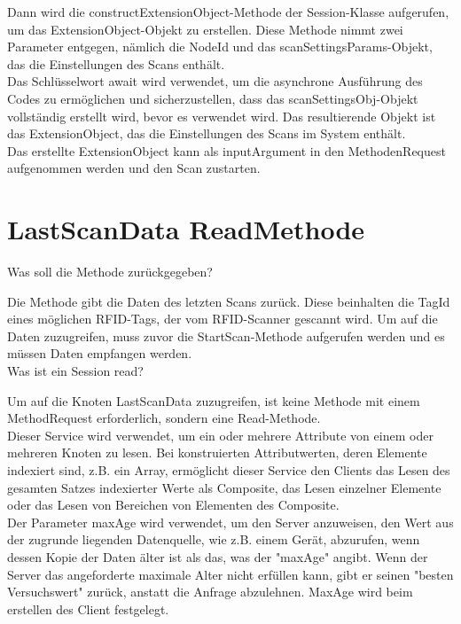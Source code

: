 Dann wird die constructExtensionObject-Methode der Session-Klasse aufgerufen, um das ExtensionObject-Objekt zu erstellen. Diese Methode nimmt zwei Parameter entgegen, nämlich die NodeId und das scanSettingsParams-Objekt, das die Einstellungen des Scans enthält.\\

Das Schlüsselwort await wird verwendet, um die asynchrone Ausführung des Codes zu ermöglichen und sicherzustellen, dass das scanSettingsObj-Objekt vollständig erstellt wird, bevor es verwendet wird. Das resultierende Objekt ist das ExtensionObject, das die Einstellungen des Scans im System enthält.\\

Das erstellte ExtensionObject kann als inputArgument in den MethodenRequest aufgenommen werden und den Scan zustarten.

\section{LastScanData ReadMethode}
Was soll die Methode zurückgegeben?

Die Methode gibt die Daten des letzten Scans zurück. Diese beinhalten die TagId eines möglichen RFID-Tags, der vom RFID-Scanner gescannt wird. Um auf die Daten zuzugreifen, muss zuvor die StartScan-Methode aufgerufen werden und es müssen Daten empfangen werden.\\

Was ist ein Session read?

Um auf die Knoten LastScanData zuzugreifen, ist keine Methode mit einem MethodRequest erforderlich, sondern eine Read-Methode.\\

Dieser Service wird verwendet, um ein oder mehrere Attribute von einem oder mehreren Knoten zu lesen. Bei konstruierten Attributwerten, deren Elemente indexiert sind, z.B. ein Array, ermöglicht dieser Service den Clients das Lesen des gesamten Satzes indexierter Werte als Composite, das Lesen einzelner Elemente oder das Lesen von Bereichen von Elementen des Composite.\\

Der Parameter \dq maxAge \dq wird verwendet, um den Server anzuweisen, den Wert aus der zugrunde liegenden Datenquelle, wie z.B. einem Gerät, abzurufen, wenn dessen Kopie der Daten älter ist als das, was der "maxAge" angibt. Wenn der Server das angeforderte maximale Alter nicht erfüllen kann, gibt er seinen "besten Versuchswert" zurück, anstatt die Anfrage abzulehnen. MaxAge wird beim erstellen des Client festgelegt.\\

